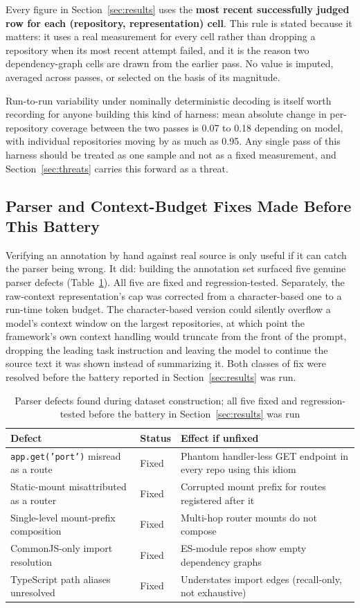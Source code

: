 \documentclass[conference]{IEEEtran}
\begin{document}
Every figure in Section~\ref{sec:results} uses the \textbf{most recent successfully judged row
for each (repository, representation) cell}. This rule is stated because it matters: it uses a
real measurement for every cell rather than dropping a repository when its most recent attempt
failed, and it is the reason two dependency-graph cells are drawn from the earlier pass. No
value is imputed, averaged across passes, or selected on the basis of its magnitude.

Run-to-run variability under nominally deterministic decoding is itself worth recording for
anyone building this kind of harness: mean absolute change in per-repository coverage between
the two passes is 0.07 to 0.18 depending on model, with individual repositories moving by as
much as 0.95. Any single pass of this harness should be treated as one sample and not as a fixed
measurement, and Section~\ref{sec:threats} carries this forward as a threat.

\subsection{Parser and Context-Budget Fixes Made Before This Battery}
\label{sec:defects}
Verifying an annotation by hand against real source is only useful if it can catch the parser
being wrong. It did: building the annotation set surfaced five genuine parser defects
(Table~\ref{tab:defects}). All five are fixed and regression-tested. Separately, the
raw-context representation's cap was corrected from a character-based one to a run-time token
budget. The character-based version could silently overflow a model's context window on the
largest repositories, at which point the framework's own context handling would truncate from
the front of the prompt, dropping the leading task instruction and leaving the model to continue
the source text it was shown instead of summarizing it. Both classes of fix were resolved before
the battery reported in Section~\ref{sec:results} was run.

\begin{table}[htbp]
\caption{Parser defects found during dataset construction; all five fixed and regression-tested
before the battery in Section~\ref{sec:results} was run}
\label{tab:defects}
\centering
\footnotesize
\begin{tabular}{@{}p{1.9cm}p{0.9cm}p{3.4cm}@{}}
\toprule
Defect & Status & Effect if unfixed \\
\midrule
\texttt{app.get('port')} misread as a route & Fixed & Phantom handler-less GET endpoint in every repo using this idiom \\
Static-mount misattributed as a router & Fixed & Corrupted mount prefix for routes registered after it \\
Single-level mount-prefix composition & Fixed & Multi-hop router mounts do not compose \\
CommonJS-only import resolution & Fixed & ES-module repos show empty dependency graphs \\
TypeScript path aliases unresolved & Fixed & Understates import edges (recall-only, not exhaustive) \\
\bottomrule
\end{tabular}
\end{table}
\end{document}
